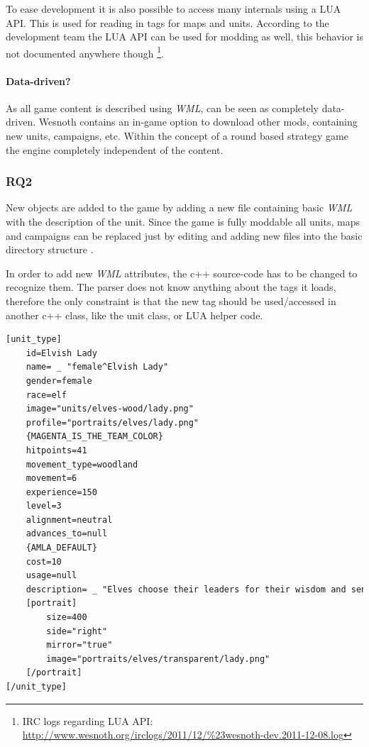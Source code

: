 To ease development it is also possible to access many internals using a LUA API. This is used for reading in
tags for maps and units. According to the development team the LUA API can be used for modding as well, this behavior
is not documented anywhere though \footnote{IRC logs regarding LUA API: \url{http://www.wesnoth.org/irclogs/2011/12/\%23wesnoth-dev.2011-12-08.log}}.

\paragraph{Data-driven?}
As all game content is described using \textit{WML}, \BOW{} can be seen as completely data-driven. Wesnoth contains an in-game option
to download other mods, containing new units, campaigns, etc. Within the concept of a round based strategy game the
engine completely independent of the content.

\subsubsection{RQ2}
New objects are added to the game by adding a new file containing basic \textit{WML} with the description of the unit.
Since the game is fully moddable all units, maps and campaigns can be replaced just by editing and adding new files into
the basic directory structure \cite{wesnothaddunit}.

In order to add new \textit{WML} attributes, the c++ source-code has to be changed to recognize them. The \BOW{} parser
does not know anything about the tags it loads, therefore the only constraint is that the new tag should be used/accessed
in another c++ class, like the unit class, or LUA helper code.

\begin{lstlisting}[language=XML,caption=A basic (shortened) \BOW{} unit definition in WML, label=wesnothwml]
[unit_type]
    id=Elvish Lady
    name= _ "female^Elvish Lady"
    gender=female
    race=elf
    image="units/elves-wood/lady.png"
    profile="portraits/elves/lady.png"
    {MAGENTA_IS_THE_TEAM_COLOR}
    hitpoints=41
    movement_type=woodland
    movement=6
    experience=150
    level=3
    alignment=neutral
    advances_to=null
    {AMLA_DEFAULT}
    cost=10
    usage=null
    description= _ "Elves choose their leaders for their wisdom and sensitivity to the balance of universal forces; foresight is what has protected them in times of uncertainty. Their just reign is rewarded by the unflagging fealty of their people, which is the greatest gift for which any ruler could ask."
    [portrait]
        size=400
        side="right"
        mirror="true"
        image="portraits/elves/transparent/lady.png"
    [/portrait]
[/unit_type]
\end{lstlisting}

